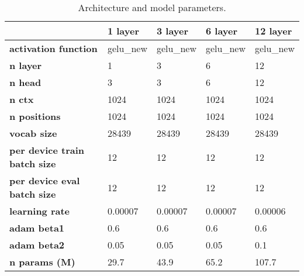 \begin{table}
\centering
\caption{Architecture and model parameters.}
\label{tab:model-train-info}
\begin{tabular}{lllll}
\toprule
{} &   1 layer &   3 layer &   6 layer &  12 layer \\
\midrule
\textbf{activation function        } &  gelu\_new &  gelu\_new &  gelu\_new &  gelu\_new \\
\textbf{n layer                    } &         1 &         3 &         6 &        12 \\
\textbf{n head                     } &         3 &         3 &         6 &        12 \\
\textbf{n ctx                      } &      1024 &      1024 &      1024 &      1024 \\
\textbf{n positions                } &      1024 &      1024 &      1024 &      1024 \\
\textbf{vocab size                 } &     28439 &     28439 &     28439 &     28439 \\
\textbf{per device train batch size} &        12 &        12 &        12 &        12 \\
\textbf{per device eval batch size } &        12 &        12 &        12 &        12 \\
\textbf{learning rate              } &   0.00007 &   0.00007 &   0.00007 &   0.00006 \\
\textbf{adam beta1                 } &       0.6 &       0.6 &       0.6 &       0.6 \\
\textbf{adam beta2                 } &      0.05 &      0.05 &      0.05 &       0.1 \\
\textbf{n params (M)               } &      29.7 &      43.9 &      65.2 &     107.7 \\
\bottomrule
\end{tabular}
\end{table}
